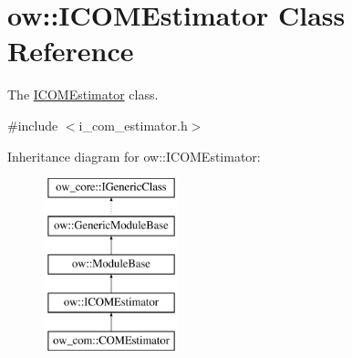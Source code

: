 \hypertarget{classow_1_1ICOMEstimator}{}\section{ow\+:\+:I\+C\+O\+M\+Estimator Class Reference}
\label{classow_1_1ICOMEstimator}


The \hyperlink{classow_1_1ICOMEstimator}{I\+C\+O\+M\+Estimator} class.  




{\ttfamily \#include $<$i\+\_\+com\+\_\+estimator.\+h$>$}

Inheritance diagram for ow\+:\+:I\+C\+O\+M\+Estimator\+:\begin{figure}[H]
\begin{center}
\leavevmode
\includegraphics[height=5.000000cm]{de/d6a/classow_1_1ICOMEstimator}
\end{center}
\end{figure}
